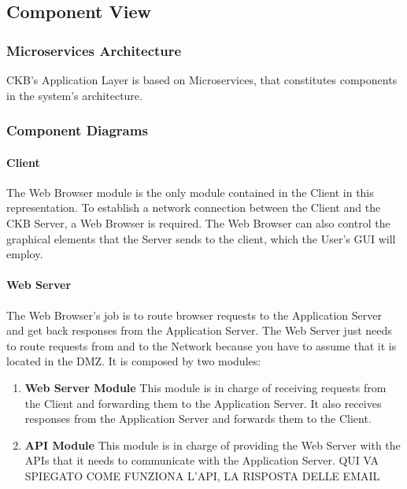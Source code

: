 \subsection{Component View}
\subsubsection{Microservices Architecture}
CKB's Application Layer is based on Microservices, that constitutes components in the system's architecture.
\newpage
\subsubsection{Component Diagrams}
\newpage

\paragraph{Client}
The Web Browser module is the only module contained in the Client in this representation.
To establish a network connection between the Client and the CKB Server, a Web Browser is required. The Web Browser can also control the graphical elements that the Server sends to the client, which the User's GUI will employ.

\paragraph{Web Server}
The Web Browser's job is to route browser requests to the Application Server and get back responses from the Application Server. The Web Server just needs to route requests from and to the Network because you have to assume 
that it is located in the DMZ. It is composed by two modules:
\begin{enumerate}[label=$\bullet$]
    \item \textbf{Web Server Module} This module is in charge of receiving requests from the Client and forwarding them to the Application Server. It also receives responses from the Application Server and forwards them to the Client.
    \item \textbf{API Module} This module is in charge of providing the Web Server with the APIs that it needs to communicate with the Application Server. QUI VA SPIEGATO COME FUNZIONA L'API, LA RISPOSTA DELLE EMAIL
\end{enumerate}
\newpage

